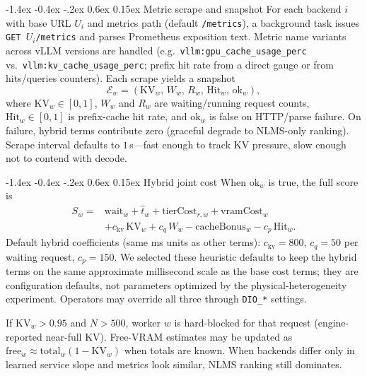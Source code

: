 \documentclass[pdflatex,sn-mathphys-num]{sn-jnl}
\makeatletter
\renewcommand{\subsection}{\@startsection{subsection}{2}{\z@}%
  {-1.4ex \@plus -0.4ex \@minus -.2ex}%
  {0.6ex \@plus 0.15ex}%
  {\normalfont\normalsize\bfseries}}%
\makeatother
\begin{document}
\subsection{Metric scrape and snapshot}
For each backend $i$ with base URL $U_i$ and metrics path (default
\texttt{/metrics}), a background task issues \texttt{GET $U_i$/metrics} and parses
Prometheus exposition text. Metric name variants across vLLM versions are handled
(e.g.\ \texttt{vllm:gpu\_cache\_usage\_perc} vs.\ \texttt{vllm:kv\_cache\_usage\_perc};
prefix hit rate from a direct gauge or from hits/queries counters). Each scrape
yields a snapshot
\begin{equation}
\mathcal{E}_w = (\mathrm{KV}_w,\, W_w,\, R_w,\, \mathrm{Hit}_w,\, \mathrm{ok}_w),
\end{equation}
where $\mathrm{KV}_w\in[0,1]$, $W_w$ and $R_w$ are waiting/running request counts,
$\mathrm{Hit}_w\in[0,1]$ is prefix-cache hit rate, and $\mathrm{ok}_w$ is false on
HTTP/parse failure. On failure, hybrid terms contribute zero (graceful degrade to
NLMS-only ranking). Scrape interval defaults to $1$\,s---fast enough to track KV
pressure, slow enough not to contend with decode.

\subsection{Hybrid joint cost}
When $\mathrm{ok}_w$ is true, the full score is
\begin{equation}
\begin{aligned}
S_w ={}& \mathrm{wait}_w + \hat{t}_w + \mathrm{tierCost}_{r,w} + \mathrm{vramCost}_w \\
&+ c_{\mathrm{kv}}\,\mathrm{KV}_w + c_{q}\,W_w
- \mathrm{cacheBonus}_w - c_{p}\,\mathrm{Hit}_w.
\end{aligned}
\label{eq:hybrid}
\end{equation}
Default hybrid coefficients (same ms units as other terms): $c_{\mathrm{kv}}{=}800$,
$c_{q}{=}50$ per waiting request, $c_{p}{=}150$. We selected these heuristic
defaults to keep the hybrid terms on the same approximate millisecond scale as the
base cost terms; they are configuration defaults, not parameters optimized by the
physical-heterogeneity experiment. Operators may override all three through
\texttt{DIO\_*} settings.

If $\mathrm{KV}_w{>}0.95$ and $N{>}500$, worker $w$ is hard-blocked for that request
(engine-reported near-full KV). Free-VRAM estimates may be updated as
$\mathrm{free}_w \approx \mathrm{total}_w(1-\mathrm{KV}_w)$ when totals are known.
When backends differ only in learned service slope and metrics look similar, NLMS
ranking still dominates.
\end{document}
